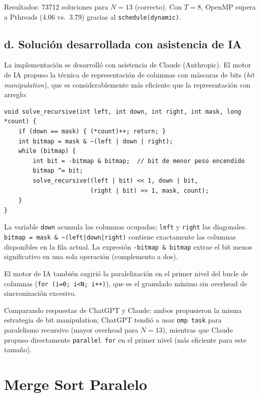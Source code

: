 \documentclass[11pt,a4paper]{article}
\begin{document}
Resultados: 73712 soluciones para $N=13$ (correcto). Con $T=8$, OpenMP supera a Pthreads (4.06 vs.\ 3.79) gracias al \texttt{schedule(dynamic)}.

\subsection*{d. Solución desarrollada con asistencia de IA}

La implementación se desarrolló con asistencia de Claude (Anthropic). El motor de IA propuso la técnica de representación de columnas con máscaras de bits (\emph{bit manipulation}), que es considerablemente más eficiente que la representación con arreglo:

\begin{lstlisting}
void solve_recursive(int left, int down, int right, int mask, long *count) {
    if (down == mask) { (*count)++; return; }
    int bitmap = mask & ~(left | down | right);
    while (bitmap) {
        int bit = -bitmap & bitmap;  // bit de menor peso encendido
        bitmap ^= bit;
        solve_recursive((left | bit) << 1, down | bit,
                        (right | bit) >> 1, mask, count);
    }
}
\end{lstlisting}

La variable \texttt{down} acumula las columnas ocupadas; \texttt{left} y \texttt{right} las diagonales. \texttt{bitmap = mask \& \~{}(left|down|right)} contiene exactamente las columnas disponibles en la fila actual. La expresión \texttt{-bitmap \& bitmap} extrae el bit menos significativo en una sola operación (complemento a dos).

El motor de IA también sugirió la paralelización en el primer nivel del bucle de columnas (\texttt{for (i=0; i<N; i++)}), que es el granulado mínimo sin overhead de sincronización excesivo.

Comparando respuestas de ChatGPT y Claude: ambos propusieron la misma estrategia de bit manipulation; ChatGPT tendió a usar \texttt{omp task} para paralelismo recursivo (mayor overhead para $N=13$), mientras que Claude propuso directamente \texttt{parallel for} en el primer nivel (más eficiente para este tamaño).

\section{Merge Sort Paralelo}
\end{document}
